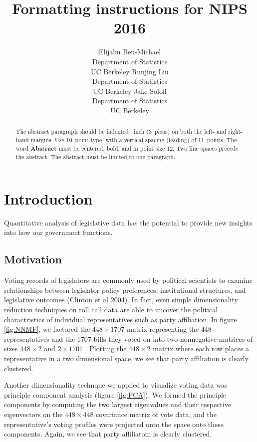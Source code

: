 \documentclass{article}
\title{Formatting instructions for NIPS 2016}
\author{
  Elijahu Ben-Michael \\
  Department of Statistics\\
  UC Berkeley
   \And
  Runjing Liu \\
  Department of Statistics\\
  UC Berkeley
   \AND
  Jake Soloff \\
  Department of Statistics\\
  UC Berkeley
}
\begin{document}

\maketitle

\begin{abstract}
  The abstract paragraph should be indented ~inch
  (3~picas) on both the left- and right-hand margins. Use 10~point
  type, with a vertical spacing (leading) of 11~points.  The word
  \textbf{Abstract} must be centered, bold, and in point size 12. Two
  line spaces precede the abstract. The abstract must be limited to
  one paragraph.
\end{abstract}

\section{Introduction}
Quantitative analysis of legislative data has the potential to provide new insights into how our government functions. 





\subsection{Motivation} 
Voting records of legislators are commonly used by political scientists to examine relationships between legislator policy preferences, institutional structures, and legislative outcomes (Clinton et al 2004). In fact, even simple dimensionality reduction techniques on roll call data are able to uncover the political charactristics of individual representatives such as party affiliation. In figure \ref{fig:NNMF}, we factored the $448\times1707$ matrix representing the 448 representatives and the 1707 bills they voted on into two nonnegative matrices of sizes $448\times 2$ and $2\times 1707$ . Plotting the  $448\times 2$ matrix where each row places a representative in a two dimensional space, we see that party affiliation is clearly clustered. \par

Another dimensionality technque we applied to visualize voting data was principle component analysis (figure \ref{fig:PCA}). We formed the principle components by computing the two largest eigenvalues and their respective eigenvectors on the $448\times 448$ covariance matrix of vote data, and the representative's voting profiles were projected onto the space onto these components. Again, we see that party affiliatoin is clearly clustered. 
\end{document}
